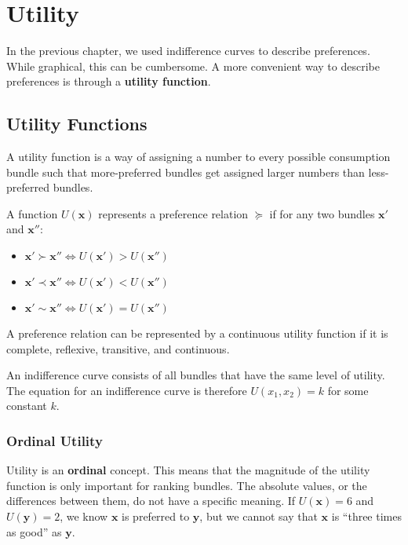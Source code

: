 \chapter{Utility}\label{chap:utility}

In the previous chapter, we used indifference curves to describe preferences. While graphical, this can be cumbersome. A more convenient way to describe preferences is through a \textbf{utility function}.

\section{Utility Functions}

A utility function is a way of assigning a number to every possible consumption bundle such that more-preferred bundles get assigned larger numbers than less-preferred bundles.

\begin{definition}
A function $U(\mathbf{x})$ represents a preference relation $\succeq$ if for any two bundles $\mathbf{x}'$ and $\mathbf{x}''$:
\begin{itemize}
    \item $\mathbf{x}' \succ \mathbf{x}'' \iff U(\mathbf{x}') > U(\mathbf{x}'')$
    \item $\mathbf{x}' \prec \mathbf{x}'' \iff U(\mathbf{x}') < U(\mathbf{x}'')$
    \item $\mathbf{x}' \sim \mathbf{x}'' \iff U(\mathbf{x}') = U(\mathbf{x}'')$
\end{itemize}
A preference relation can be represented by a continuous utility function if it is complete, reflexive, transitive, and continuous.
\end{definition}

An indifference curve consists of all bundles that have the same level of utility. The equation for an indifference curve is therefore $U(x_1, x_2) = k$ for some constant $k$.

\subsection{Ordinal Utility}
Utility is an \textbf{ordinal} concept. This means that the magnitude of the utility function is only important for ranking bundles. The absolute values, or the differences between them, do not have a specific meaning. If $U(\mathbf{x})=6$ and $U(\mathbf{y})=2$, we know $\mathbf{x}$ is preferred to $\mathbf{y}$, but we cannot say that $\mathbf{x}$ is ``three times as good'' as $\mathbf{y}$.

